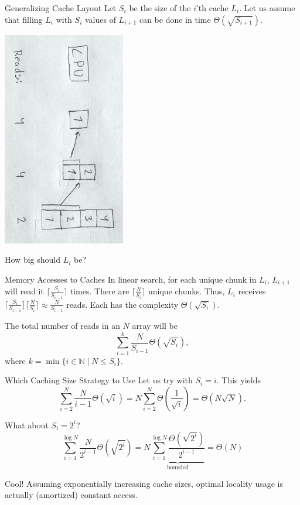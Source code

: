 \documentclass{beamer}
\begin{document}
\begin{frame}{Generalizing Cache Layout}
Let $S_i$ be the size of the $i$'th cache $L_i$. Let us assume that filling $L_i$ with $S_i$ values of $L_{i+1}$ can be done in time $\Theta(\sqrt{S_{i+1}})$.

\begin{center}
\includegraphics[width=0.4\textwidth,page=2,angle=90,origin=c]{resources/hand_drawings2.pdf}
\end{center}
\vspace{-3cm}

\pause
How big should $L_i$ be?
\end{frame}

\begin{frame}{Memory Accesses to Caches}
  In linear search, for each unique chunk in $L_i$, $L_{i+1}$ will read it $\lceil \frac{S_i}{S_{i-1}} \rceil$ times. There are $\lceil \frac{N}{S_i} \rceil$ unique chunks. Thus, $L_i$ receives $\lceil \frac{S_i}{S_{i-1}} \rceil \lceil \frac{N}{S_i} \rceil \approx \frac{N}{S_{i-1}}$ reads. Each has the complexity $\Theta(\sqrt{S_i})$.

\vfill
\pause
The total number of reads in an $N$ array will be
\[
  \sum^{k}_{i=1} \frac{N}{S_{i-1}} \Theta(\sqrt{S_i}),
\]
where $k=\min\{i\in \mathbb{N} \mid N \leq S_i\}$.

\end{frame}

\begin{frame}{Which Caching Size Strategy to Use}
Let us try with $S_i = i$. This yields
\[
  \sum^N_{i=2} \frac{N}{i-1} \Theta(\sqrt{i}) = N \sum^N_{i=2} \Theta\left(\frac{1}{\sqrt{i}}\right) = \Theta(N\sqrt{N}).
\]

\pause
What about $S_i = 2^i$?
\[
  \sum^{\log N}_{i=1} \frac{N}{2^{i-1}} \Theta(\sqrt{2^i}) = N \underbrace{\sum^{\log N}_{i=1} \frac{\Theta(\sqrt{2^i})}{2^{i-1}}}_{\text{bounded}} = \Theta(N)
\]

\pause
Cool! Assuming exponentially increasing cache sizes, optimal locality usage is actually (amortized) constant access.
\end{frame}
\end{document}
